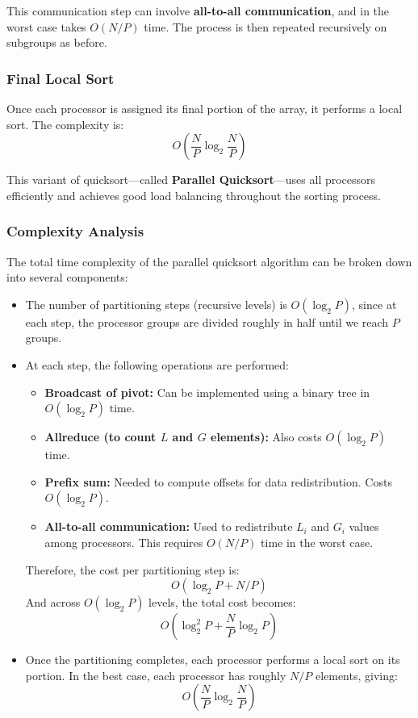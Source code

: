 \documentclass[12pt]{book}
\begin{document}
This communication step can involve \textbf{all-to-all communication}, and in the worst case takes $O(N/P)$ time. The process is then repeated recursively on subgroups as before.

\subsubsection*{Final Local Sort}

Once each processor is assigned its final portion of the array, it performs a local sort. The complexity is:
\[
O\left(\frac{N}{P} \log_2 \frac{N}{P} \right)
\]

This variant of quicksort—called \textbf{Parallel Quicksort}—uses all processors efficiently and achieves good load balancing throughout the sorting process.

\subsubsection{Complexity Analysis}

The total time complexity of the parallel quicksort algorithm can be broken down into several components:

\begin{itemize}
    \item The number of partitioning steps (recursive levels) is $O(\log_2 P)$, since at each step, the processor groups are divided roughly in half until we reach $P$ groups.
    
    \item At each step, the following operations are performed:
    \begin{itemize}
        \item \textbf{Broadcast of pivot:} Can be implemented using a binary tree in $O(\log_2 P)$ time.
        \item \textbf{Allreduce (to count $L$ and $G$ elements):} Also costs $O(\log_2 P)$ time.
        \item \textbf{Prefix sum:} Needed to compute offsets for data redistribution. Costs $O(\log_2 P)$.
        \item \textbf{All-to-all communication:} Used to redistribute $L_i$ and $G_i$ values among processors. This requires $O(N/P)$ time in the worst case.
    \end{itemize}
    
    Therefore, the cost per partitioning step is:
    \[
    O(\log_2 P + N/P)
    \]
    And across $O(\log_2 P)$ levels, the total cost becomes:
    \[
    O(\log_2^2 P + \frac{N}{P} \log_2 P)
    \]
    
    \item Once the partitioning completes, each processor performs a local sort on its portion. In the best case, each processor has roughly $N/P$ elements, giving:
    \[
    O\left(\frac{N}{P} \log_2 \frac{N}{P}\right)
    \]
\end{itemize}
\end{document}
